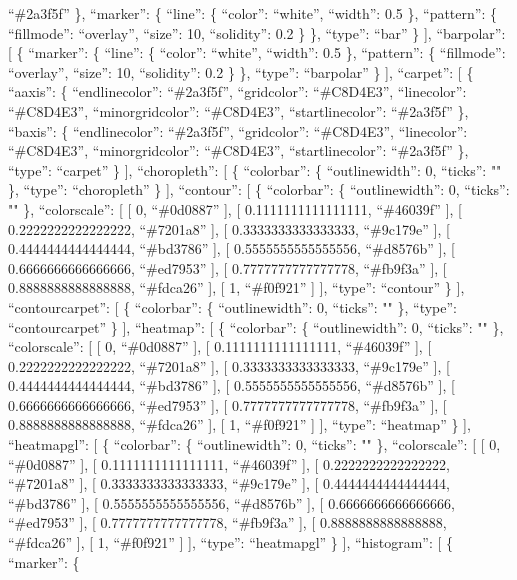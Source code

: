 \documentclass[
]{article}
\begin{document}
``\#2a3f5f'' \}, ``marker'': \{ ``line'': \{ ``color'': ``white'',
``width'': 0.5 \}, ``pattern'': \{ ``fillmode'': ``overlay'', ``size'':
10, ``solidity'': 0.2 \} \}, ``type'': ``bar'' \} {]}, ``barpolar'': {[}
\{ ``marker'': \{ ``line'': \{ ``color'': ``white'', ``width'': 0.5 \},
``pattern'': \{ ``fillmode'': ``overlay'', ``size'': 10, ``solidity'':
0.2 \} \}, ``type'': ``barpolar'' \} {]}, ``carpet'': {[} \{ ``aaxis'':
\{ ``endlinecolor'': ``\#2a3f5f'', ``gridcolor'': ``\#C8D4E3'',
``linecolor'': ``\#C8D4E3'', ``minorgridcolor'': ``\#C8D4E3'',
``startlinecolor'': ``\#2a3f5f'' \}, ``baxis'': \{ ``endlinecolor'':
``\#2a3f5f'', ``gridcolor'': ``\#C8D4E3'', ``linecolor'': ``\#C8D4E3'',
``minorgridcolor'': ``\#C8D4E3'', ``startlinecolor'': ``\#2a3f5f'' \},
``type'': ``carpet'' \} {]}, ``choropleth'': {[} \{ ``colorbar'': \{
``outlinewidth'': 0, ``ticks'': "" \}, ``type'': ``choropleth'' \} {]},
``contour'': {[} \{ ``colorbar'': \{ ``outlinewidth'': 0, ``ticks'': ""
\}, ``colorscale'': {[} {[} 0, ``\#0d0887'' {]}, {[} 0.1111111111111111,
``\#46039f'' {]}, {[} 0.2222222222222222, ``\#7201a8'' {]}, {[}
0.3333333333333333, ``\#9c179e'' {]}, {[} 0.4444444444444444,
``\#bd3786'' {]}, {[} 0.5555555555555556, ``\#d8576b'' {]}, {[}
0.6666666666666666, ``\#ed7953'' {]}, {[} 0.7777777777777778,
``\#fb9f3a'' {]}, {[} 0.8888888888888888, ``\#fdca26'' {]}, {[} 1,
``\#f0f921'' {]} {]}, ``type'': ``contour'' \} {]}, ``contourcarpet'':
{[} \{ ``colorbar'': \{ ``outlinewidth'': 0, ``ticks'': "" \}, ``type'':
``contourcarpet'' \} {]}, ``heatmap'': {[} \{ ``colorbar'': \{
``outlinewidth'': 0, ``ticks'': "" \}, ``colorscale'': {[} {[} 0,
``\#0d0887'' {]}, {[} 0.1111111111111111, ``\#46039f'' {]}, {[}
0.2222222222222222, ``\#7201a8'' {]}, {[} 0.3333333333333333,
``\#9c179e'' {]}, {[} 0.4444444444444444, ``\#bd3786'' {]}, {[}
0.5555555555555556, ``\#d8576b'' {]}, {[} 0.6666666666666666,
``\#ed7953'' {]}, {[} 0.7777777777777778, ``\#fb9f3a'' {]}, {[}
0.8888888888888888, ``\#fdca26'' {]}, {[} 1, ``\#f0f921'' {]} {]},
``type'': ``heatmap'' \} {]}, ``heatmapgl'': {[} \{ ``colorbar'': \{
``outlinewidth'': 0, ``ticks'': "" \}, ``colorscale'': {[} {[} 0,
``\#0d0887'' {]}, {[} 0.1111111111111111, ``\#46039f'' {]}, {[}
0.2222222222222222, ``\#7201a8'' {]}, {[} 0.3333333333333333,
``\#9c179e'' {]}, {[} 0.4444444444444444, ``\#bd3786'' {]}, {[}
0.5555555555555556, ``\#d8576b'' {]}, {[} 0.6666666666666666,
``\#ed7953'' {]}, {[} 0.7777777777777778, ``\#fb9f3a'' {]}, {[}
0.8888888888888888, ``\#fdca26'' {]}, {[} 1, ``\#f0f921'' {]} {]},
``type'': ``heatmapgl'' \} {]}, ``histogram'': {[} \{ ``marker'': \{
\end{document}
